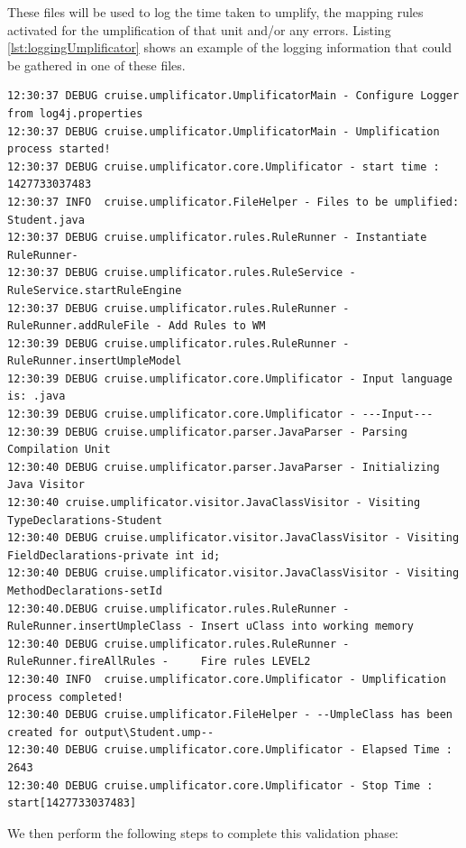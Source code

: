 These files will be used to log the time taken to umplify, the mapping rules activated for the umplification of that unit and/or any errors. Listing \ref{lst:loggingUmplificator} shows an example of the logging information that could be gathered in one of these files.
\begin{lstlisting}[style=umplePlain, caption= Logging Information Sample gathered by the Umplificator, label=lst:loggingUmplificator]
12:30:37 DEBUG cruise.umplificator.UmplificatorMain - Configure Logger from log4j.properties
12:30:37 DEBUG cruise.umplificator.UmplificatorMain - Umplification process started!
12:30:37 DEBUG cruise.umplificator.core.Umplificator - start time : 1427733037483
12:30:37 INFO  cruise.umplificator.FileHelper - Files to be umplified: Student.java
12:30:37 DEBUG cruise.umplificator.rules.RuleRunner - Instantiate RuleRunner- 
12:30:37 DEBUG cruise.umplificator.rules.RuleService - RuleService.startRuleEngine
12:30:37 DEBUG cruise.umplificator.rules.RuleRunner - RuleRunner.addRuleFile - Add Rules to WM
12:30:39 DEBUG cruise.umplificator.rules.RuleRunner - RuleRunner.insertUmpleModel 
12:30:39 DEBUG cruise.umplificator.core.Umplificator - Input language is: .java
12:30:39 DEBUG cruise.umplificator.core.Umplificator - ---Input---
12:30:39 DEBUG cruise.umplificator.parser.JavaParser - Parsing Compilation Unit
12:30:40 DEBUG cruise.umplificator.parser.JavaParser - Initializing Java Visitor 
12:30:40 cruise.umplificator.visitor.JavaClassVisitor - Visiting TypeDeclarations-Student
12:30:40 DEBUG cruise.umplificator.visitor.JavaClassVisitor - Visiting FieldDeclarations-private int id;
12:30:40 DEBUG cruise.umplificator.visitor.JavaClassVisitor - Visiting MethodDeclarations-setId
12:30:40.DEBUG cruise.umplificator.rules.RuleRunner - RuleRunner.insertUmpleClass - Insert uClass into working memory
12:30:40 DEBUG cruise.umplificator.rules.RuleRunner - RuleRunner.fireAllRules -     Fire rules LEVEL2
12:30:40 INFO  cruise.umplificator.core.Umplificator - Umplification process completed!
12:30:40 DEBUG cruise.umplificator.FileHelper - --UmpleClass has been created for output\Student.ump--
12:30:40 DEBUG cruise.umplificator.core.Umplificator - Elapsed Time : 2643
12:30:40 DEBUG cruise.umplificator.core.Umplificator - Stop Time : start[1427733037483]
\end{lstlisting}

We then perform the following steps to complete this validation phase:

